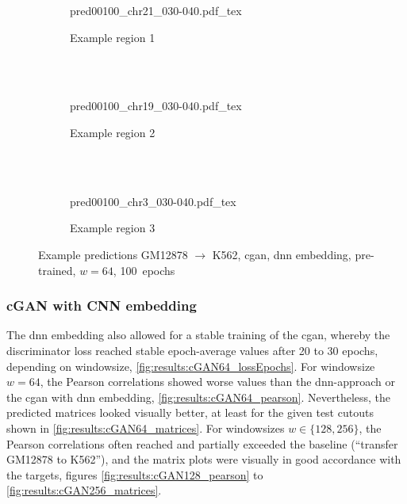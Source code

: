 \begin{figure}[p] %
    \begin{subfigure}{\textwidth}
        \centering
        \scriptsize
        {pred00100_chr21_030-040.pdf_tex}
        \caption{Example  region 1} \label{fig:results:cGAN64_pretrain-dnn_r1}
    \end{subfigure}\\[2mm]
    \\[3mm]
    \begin{subfigure}{\textwidth}
        \centering
        \scriptsize
        {pred00100_chr19_030-040.pdf_tex}
        \caption{Example region 2} \label{fig:results:cGAN64_pretrain-dnn_r2}
    \end{subfigure}\\[2mm]
    \\[3mm]
    \begin{subfigure}{\textwidth}
        \centering
        \scriptsize
        {pred00100_chr3_030-040.pdf_tex}
        \caption{Example region 3} \label{fig:results:cGAN64_pretrain-dnn_r3}
    \end{subfigure}
    \caption{Example predictions GM12878 $\rightarrow$ K562, \acrshort{cgan}, \acrshort{dnn} embedding, pre-trained, $w=64$, 100~epochs} \label{fig:results:cGAN64_pretrain-dnn_matrices}
\end{figure}


\subsubsection{cGAN with CNN embedding} \label{sec:results:cgan_cnn}
The \acrshort{dnn} embedding also allowed for a stable training of the \acrshort{cgan},
whereby the discriminator loss reached stable epoch-average values after 20 to 30 epochs, depending on windowsize, \cref{fig:results:cGAN64_lossEpochs}.
For windowsize $w=64$, the Pearson correlations showed worse values than the \acrshort{dnn}-approach or the \acrshort{cgan} with \acrshort{dnn} embedding, \cref{fig:results:cGAN64_pearson}.
Nevertheless, the predicted matrices looked visually better, at least for the given test cutouts shown in \cref{fig:results:cGAN64_matrices}. 
For windowsizes $w\in\{128,256\}$, the Pearson correlations often reached and partially exceeded the baseline (``transfer GM12878 to K562''),
and the matrix plots were visually in good accordance with the targets, figures \ref{fig:results:cGAN128_pearson} to \ref{fig:results:cGAN256_matrices}.

